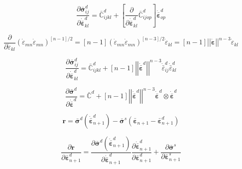 \documentclass[12pt]{article}
\newcommand{\pder}[2]{\dfrac{\partial #1}{\partial #2}}
\begin{document}
\begin{equation}
	\pder{\bar{\bm{\sigma}}^{d}_{ij}}{\dot{\bar{\bm{\varepsilon}}}_{kl}^{d}} = \bar{\mathbb{C}}^{d}_{ijkl} + \left[\pder{ }{\dot{\bar{\bm{\varepsilon}}}_{kl}^{d}} \bar{\mathbb{C}}^{d}_{ijop}\right]\dot{\bar{\bm{\varepsilon}}}_{op}^{d}
\end{equation}

\begin{equation}
	\pder{ }{\dot{\varepsilon}_{kl}}\left(\dot{\varepsilon}_{mn}\dot{\varepsilon}_{mn}\right)^{\left[n-1\right]/2} = \left[n-1\right]\left(\dot{\varepsilon}_{mn}\dot{\varepsilon}_{mn}\right)^{\left[n-3\right]/2}\dot{\varepsilon}_{kl} = \left[n-1\right]\left|\left|\dot{\bm{\varepsilon}}\right |\right|^{n-3}\dot{\varepsilon}_{kl}
\end{equation}

\begin{equation}
		\pder{\bar{\bm{\sigma}}^{d}_{ij}}{\dot{\bar{\bm{\varepsilon}}}_{kl}^{d}} = \bar{\mathbb{C}}^{d}_{ijkl} +\left[n-1\right]\left|\left|\dot{\bar{\bm{\varepsilon}}}^{d}\right |\right|^{n-3}\dot{\bar{\varepsilon}}^{d}_{ij}\dot{\bar{\varepsilon}}^{d}_{kl}
\end{equation}


\begin{equation}
\pder{\bar{\bm{\sigma}}^{d}}{\dot{\bar{\bm{\varepsilon}}}^{d}} = \bar{\mathbb{C}}^{d} +\left[n-1\right]\left|\left|\dot{\bar{\bm{\varepsilon}}}^{d}\right |\right|^{n-3}\dot{\bar{\bm{\varepsilon}}}^{d}\otimes\dot{\bar{\bm{\varepsilon}}}^{d}
\end{equation}

\begin{equation}
	\bm{r} = \bar{\bm{\sigma}}^{d}\left(\dot{\bar{\bm{\varepsilon}}}_{n+1}^{d}\right) - \bar{\bm{\sigma}}^{s}(\bar{\bm{\varepsilon}}_{n+1} - \bar{\bm{\varepsilon}}_{n+1}^{d})  
\end{equation}

\begin{equation}
	\pder{\bm{r}}{\bar{\bm{\varepsilon}}_{n+1}^{d}} = \pder{\bar{\bm{\sigma}}^{d}\left(\dot{\bar{\bm{\varepsilon}}}_{n+1}^{d}\right)}{\dot{\bar{\bm{\varepsilon}}}_{n+1}^{d}}\pder{\dot{\bar{\bm{\varepsilon}}}_{n+1}^{d}}{\bar{\bm{\varepsilon}}_{n+1}^{d}} + \pder{\bar{\bm{\sigma}}^{s}}{\bar{\bm{\varepsilon}}_{n+1}^{s}}
\end{equation}
\end{document}

